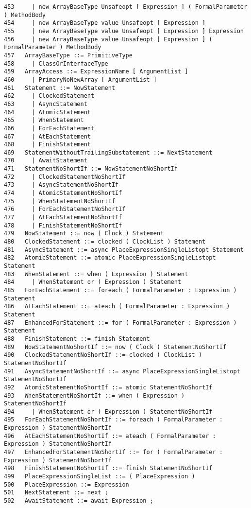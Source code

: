 {\begin{verbatim}
453     | new ArrayBaseType Unsafeopt [ Expression ] ( FormalParameter ) MethodBody
454     | new ArrayBaseType value Unsafeopt [ Expression ]
455     | new ArrayBaseType value Unsafeopt [ Expression ] Expression
456     | new ArrayBaseType value Unsafeopt [ Expression ] ( FormalParameter ) MethodBody
457   ArrayBaseType ::= PrimitiveType
458     | ClassOrInterfaceType
459   ArrayAccess ::= ExpressionName [ ArgumentList ]
460     | PrimaryNoNewArray [ ArgumentList ]
461   Statement ::= NowStatement
462     | ClockedStatement
463     | AsyncStatement
464     | AtomicStatement
465     | WhenStatement
466     | ForEachStatement
467     | AtEachStatement
468     | FinishStatement
469   StatementWithoutTrailingSubstatement ::= NextStatement
470     | AwaitStatement
471   StatementNoShortIf ::= NowStatementNoShortIf
472     | ClockedStatementNoShortIf
473     | AsyncStatementNoShortIf
474     | AtomicStatementNoShortIf
475     | WhenStatementNoShortIf
476     | ForEachStatementNoShortIf
477     | AtEachStatementNoShortIf
478     | FinishStatementNoShortIf
479   NowStatement ::= now ( Clock ) Statement
480   ClockedStatement ::= clocked ( ClockList ) Statement
481   AsyncStatement ::= async PlaceExpressionSingleListopt Statement
482   AtomicStatement ::= atomic PlaceExpressionSingleListopt Statement
483   WhenStatement ::= when ( Expression ) Statement
484     | WhenStatement or ( Expression ) Statement
485   ForEachStatement ::= foreach ( FormalParameter : Expression ) Statement
486   AtEachStatement ::= ateach ( FormalParameter : Expression ) Statement
487   EnhancedForStatement ::= for ( FormalParameter : Expression ) Statement
488   FinishStatement ::= finish Statement
489   NowStatementNoShortIf ::= now ( Clock ) StatementNoShortIf
490   ClockedStatementNoShortIf ::= clocked ( ClockList ) StatementNoShortIf
491   AsyncStatementNoShortIf ::= async PlaceExpressionSingleListopt StatementNoShortIf
492   AtomicStatementNoShortIf ::= atomic StatementNoShortIf
493   WhenStatementNoShortIf ::= when ( Expression ) StatementNoShortIf
494     | WhenStatement or ( Expression ) StatementNoShortIf
495   ForEachStatementNoShortIf ::= foreach ( FormalParameter : Expression ) StatementNoShortIf
496   AtEachStatementNoShortIf ::= ateach ( FormalParameter : Expression ) StatementNoShortIf
497   EnhancedForStatementNoShortIf ::= for ( FormalParameter : Expression ) StatementNoShortIf
498   FinishStatementNoShortIf ::= finish StatementNoShortIf
499   PlaceExpressionSingleList ::= ( PlaceExpression )
500   PlaceExpression ::= Expression
501   NextStatement ::= next ;
502   AwaitStatement ::= await Expression ;

\end{verbatim}}
